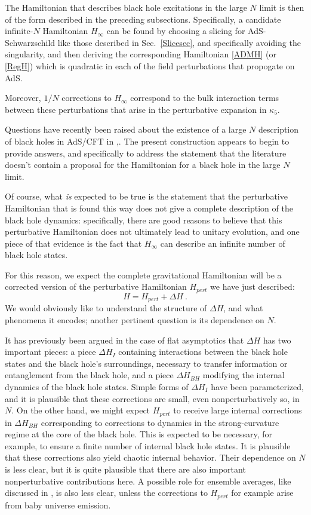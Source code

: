 \documentclass[12pt]{article}
\numberwithin{equation}{section}
\newcommand{\beq}{\begin{equation}}
\newcommand{\eeq}{\end{equation}}
\begin{document}
The Hamiltonian that describes black hole excitations in the large $N$ limit is then of the form described in the preceding subsections.  Specifically, a candidate infinite-$N$ Hamiltonian $H_\infty$ can be found by choosing a slicing for AdS-Schwarzschild like those described in Sec.~\ref{Slicesec}, and specifically avoiding the singularity, and then deriving the corresponding  Hamiltonian \eqref{ADMH} (or \eqref{RegH}) which is quadratic in each of the field perturbations that propogate on AdS.  

Moreover, $1/N$ corrections to $H_\infty$ correspond to the bulk interaction terms between these perturbations that arise in the perturbative expansion in $\kappa_5$. 

Questions have recently been raised about the existence of a large $N$ description of black holes in AdS/CFT in \cite{WittQFT,Wittcross},\cite{ScWi}.  The present construction appears to begin to provide answers, and specifically to address the statement\cite{ScWi} that the literature doesn't contain a proposal for the Hamiltonian for a black hole in the large $N$ limit.

Of course, what {\it is} expected to be true is the statement that the perturbative Hamiltonian that is found this way does not give a complete description of the black hole dynamics:  specifically, there are good reasons to believe that this perturbative Hamiltonian does not ultimately lead to unitary evolution, and one piece of that evidence is the fact that $H_\infty$ can describe an infinite number of black hole states.  

For this reason, we expect the complete gravitational Hamiltonian will be a corrected version of the perturbative Hamiltonian $H_{pert}$ we have just described:
\beq
H = H_{pert} + \Delta H\ .
\eeq
We would obviously like to understand the structure of $\Delta H$, and what phenomena it encodes; another pertinent question is its dependence on $N$.

It has previously been argued\cite{NVNL,NVNLT,NVU,BHQU} in the case of flat asymptotics that $\Delta H$ has two important pieces: a piece $\Delta H_I$ containing interactions between the black hole states and the black hole's surroundings, necessary to transfer information or entanglement from the black hole, and a piece $\Delta H_{BH}$ modifying the internal dynamics of the black hole states.  Simple forms of $\Delta H_I$ have been parameterized\cite{NVU}, and it is plausible that these corrections are small, even nonperturbatively so, in $N$.  On the other hand, we might expect $H_{pert}$ to receive large internal corrections in $\Delta H_{BH}$  corresponding to corrections to dynamics in the strong-curvature regime at the core of the black hole.  
This is expected to be necessary, for example, to ensure a finite number of internal black hole states.
It is plausible that these corrections also yield chaotic internal behavior.  Their dependence on $N$ is less clear, but it is quite plausible that there are also important nonperturbative contributions here.  A possible role for ensemble averages, like discussed in \cite{ScWi}, is also less clear, unless the corrections to $H_{pert}$ for example arise from baby universe emission\cite{Cole,GiSt,MaMa,GiTu,SGthm,HTY}.
\end{document}
